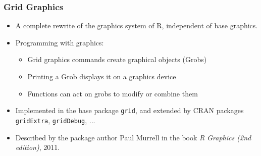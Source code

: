 \documentclass[xcolor=svgnames]{beamer}
\newcommand{\code}[1]{\texttt{#1}}
\begin{document}


\begin{frame}
   \frametitle{Grid Graphics}

   \begin{itemize}
   \item A complete rewrite of the graphics system of R, independent of
      base graphics.
   \item Programming with graphics:
      \begin{itemize}
      \item Grid graphics commands create graphical objects (Grobs)
      \item Printing a Grob displays it on a graphics device
      \item Functions can act on grobs to modify or combine them
      \end{itemize}
   \item Implemented in the base package \code{grid}, and extended
      by CRAN packages \code{gridExtra}, \code{gridDebug}, ...
   \item Described by the package author Paul Murrell in the book
       {\em R Graphics (2nd edition)}, 2011.
   \end{itemize}

\end{frame}
\end{document}
